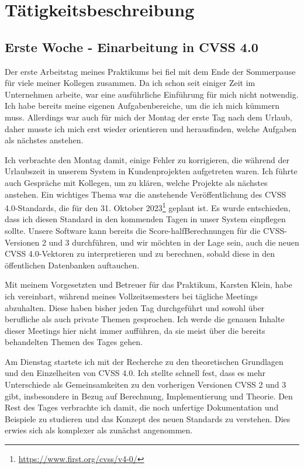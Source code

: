

\chapter{Tätigkeitsbeschreibung} \label{ch:wochenberichte}


\section{Erste Woche - Einarbeitung in CVSS 4.0} \label{sec:bericht-wo-1}

Der erste Arbeitstag meines Praktikums bei \metaeffekt fiel mit dem Ende der Sommerpause für viele meiner Kollegen zusammen.
Da ich schon seit einiger Zeit im Unternehmen arbeite, war eine ausführliche Einführung für mich nicht notwendig.
Ich habe bereits meine eigenen Aufgabenbereiche, um die ich mich kümmern muss.
Allerdings war auch für mich der Montag der erste Tag nach dem Urlaub, daher musste ich mich erst wieder orientieren und herausfinden, welche Aufgaben als nächstes anstehen.

Ich verbrachte den Montag damit, einige Fehler zu korrigieren, die während der Urlaubszeit in unserem System in Kundenprojekten aufgetreten waren.
Ich führte auch Gespräche mit Kollegen, um zu klären, welche Projekte als nächstes anstehen.
Ein wichtiges Thema war die anstehende Veröffentlichung des CVSS 4.0-Standards, die für den 31. Oktober 2023\footnote{\url{https://www.first.org/cvss/v4-0/}} geplant ist.
Es wurde entschieden, dass ich diesen Standard in den kommenden Tagen in unser System einpflegen sollte.
Unsere Software kann bereits die Score-halfBerechnungen für die CVSS-Versionen 2 und 3 durchführen, und wir möchten in der Lage sein, auch die neuen CVSS 4.0-Vektoren zu interpretieren und zu berechnen, sobald diese in den öffentlichen Datenbanken auftauchen.

Mit meinem Vorgesetzten und Betreuer für das Praktikum, Karsten Klein, habe ich vereinbart, während meines Vollzeitsemesters bei \metaeffekt tägliche Meetings abzuhalten.
Diese haben bisher jeden Tag durchgeführt und sowohl über berufliche als auch private Themen gesprochen.
Ich werde die genauen Inhalte dieser Meetings hier nicht immer aufführen, da sie meist über die bereits behandelten Themen des Tages gehen.

Am Dienstag startete ich mit der Recherche zu den theoretischen Grundlagen und den Einzelheiten von CVSS 4.0.
Ich stellte schnell fest, dass es mehr Unterschiede als Gemeinsamkeiten zu den vorherigen Versionen CVSS 2 und 3 gibt, insbesondere in Bezug auf Berechnung, Implementierung und Theorie.
Den Rest des Tages verbrachte ich damit, die noch unfertige Dokumentation und Beispiele zu studieren und das Konzept des neuen Standards zu verstehen.
Dies erwies sich als komplexer als zunächst angenommen.


